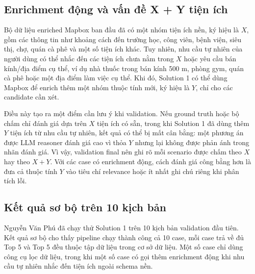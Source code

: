 \documentclass[a4paper,12pt]{article}
\begin{document}
\subsection{Enrichment động và vấn đề X + Y tiện ích}
Bộ dữ liệu enriched Mapbox ban đầu đã có một nhóm tiện ích nền, ký hiệu là $X$, gồm các thông tin như khoảng cách đến trường học, công viên, bệnh viện, siêu thị, chợ, quán cà phê và một số tiện ích khác. Tuy nhiên, nhu cầu tự nhiên của người dùng có thể nhắc đến các tiện ích chưa nằm trong $X$ hoặc yêu cầu bán kính/địa điểm cụ thể, ví dụ nhà thuốc trong bán kính 500 m, phòng gym, quán cà phê hoặc một địa điểm làm việc cụ thể. Khi đó, Solution 1 có thể dùng Mapbox để enrich thêm một nhóm thuộc tính mới, ký hiệu là $Y$, chỉ cho các candidate cần xét.

Điều này tạo ra một điểm cần lưu ý khi validation. Nếu ground truth hoặc bộ chấm chỉ đánh giá dựa trên $X$ tiện ích có sẵn, trong khi Solution 1 đã dùng thêm $Y$ tiện ích từ nhu cầu tự nhiên, kết quả có thể bị mất cân bằng: một phương án được LLM reasoner đánh giá cao vì thỏa $Y$ nhưng lại không được phản ánh trong nhãn đánh giá. Vì vậy, validation final nên ghi rõ mỗi scenario được chấm theo $X$ hay theo $X + Y$. Với các case có enrichment động, cách đánh giá công bằng hơn là đưa cả thuộc tính $Y$ vào tiêu chí relevance hoặc ít nhất ghi chú riêng khi phân tích lỗi.

\subsection{Kết quả sơ bộ trên 10 kịch bản}
Nguyễn Văn Phú đã chạy thử Solution 1 trên 10 kịch bản validation đầu tiên. Kết quả sơ bộ cho thấy pipeline chạy thành công cả 10 case, mỗi case trả về đủ Top 5 và Top 5 đều thuộc tập dữ liệu trong cơ sở dữ liệu. Một số case chỉ dùng công cụ lọc dữ liệu, trong khi một số case có gọi thêm enrichment động khi nhu cầu tự nhiên nhắc đến tiện ích ngoài schema nền.
\end{document}

